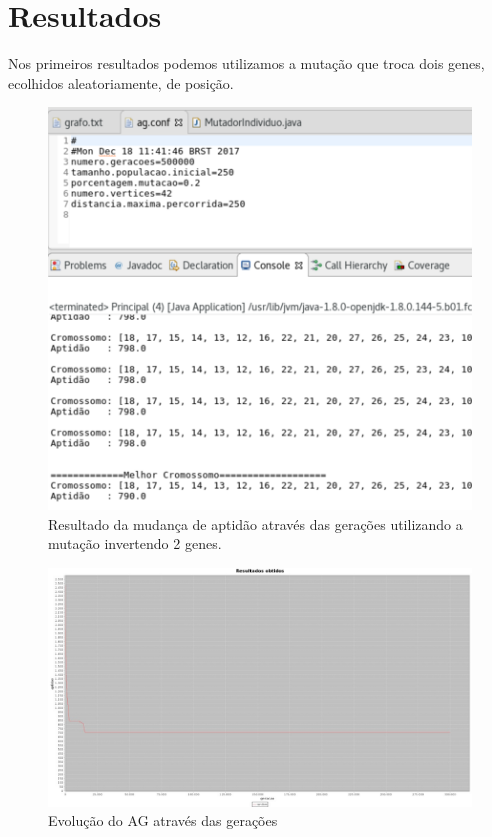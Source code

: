 \documentclass[
article,			%
11pt,				%
oneside,			%
a4paper,			%
english,			%
brazil,				%
sumario=tradicional
]{article}
\begin{document}
	\section{Resultados}
	
	Nos primeiros resultados podemos utilizamos a mutação que troca dois genes, ecolhidos aleatoriamente, de posição.

	\begin{figure}[H]
		\centering
		\includegraphics[width=1\textwidth]{Figuras/resultado-2genes.png}
		\caption{Resultado da mudança de aptidão através das gerações utilizando a mutação invertendo 2 genes.}
	\end{figure}
	
	\begin{figure}[H]
		\centering
		\includegraphics[width=1\textwidth]{Figuras/resultado1.jpeg}
		\caption{Evolução do AG através das gerações}
	\end{figure}
\end{document}
